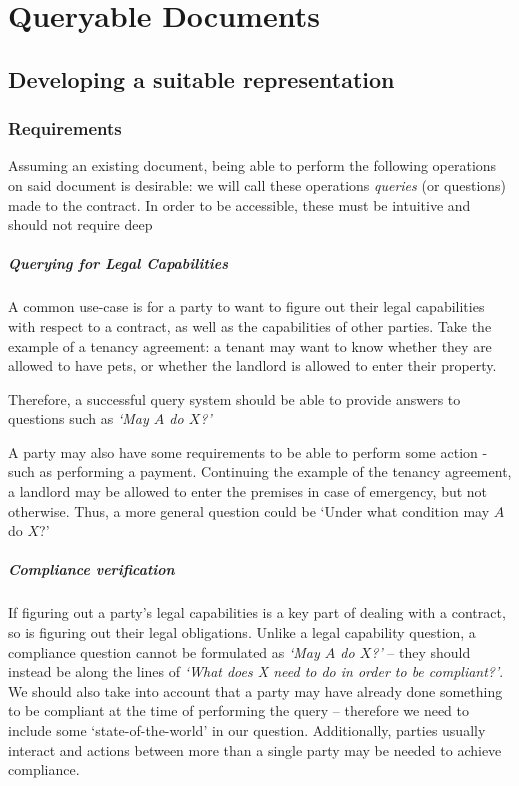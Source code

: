 \chapter{Queryable Documents}\label{ch:queries}

\section{Developing a suitable representation}\label{sec:queries-representation}

\subsection{Requirements}\label{subsec:queries-requirements}

Assuming an existing document, being able to perform the following operations on said document is desirable: we will call these operations \emph{queries} (or questions) made to the contract.
In order to be accessible, these must be intuitive and should not require deep

\paragraph{Querying for Legal Capabilities} A common use-case is for a party to want to figure out their legal capabilities with respect to a contract, as well as the capabilities of other parties.
Take the example of a tenancy agreement: a tenant may want to know whether they are allowed to have pets, or whether the landlord is allowed to enter their property.

Therefore, a successful query system should be able to provide answers to questions such as \textit{`May $A$ do $X$?'}

A party may also have some requirements to be able to perform some action - such as performing a payment.
Continuing the example of the tenancy agreement, a landlord may be allowed to enter the premises in case of emergency, but not otherwise.
Thus, a more general question could be `Under what condition may $A$ do $X$?'

\paragraph{Compliance verification} If figuring out a party's legal capabilities is a key part of dealing with a contract, so is figuring out their legal obligations.
Unlike a legal capability question, a compliance question cannot be formulated as \textit{`May $A$ do $X$?'} -- they should instead be along the lines of \textit{`What does X need to do in order to be compliant?'}.
We should also take into account that a party may have already done something to be compliant at the time of performing the query -- therefore we need to include some `state-of-the-world' in our question.
    Additionally, parties usually interact and actions between more than a single party may be needed to achieve compliance.

